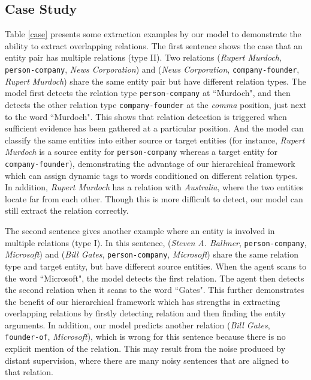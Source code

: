 \documentclass[letterpaper]{article}
\theoremstyle{definition}
\begin{document}
\subsection{Case Study}


Table \ref{case} presents some extraction examples by our model to demonstrate the ability to extract overlapping relations. The first sentence shows the case that an entity pair has multiple relations (type II). Two relations (\textit{Rupert Murdoch}, \texttt{person-company}, \textit{News Corporation}) and (\textit{News Corporation}, \texttt{company-founder}, \textit{Rupert Murdoch}) share the same entity pair but have different relation types. The model first detects the relation type \texttt{person-company} at ``Murdoch", and then detects the other relation type \texttt{company-founder} at the \textit{comma} position, just next to the word ``Murdoch". This shows that relation detection is triggered when sufficient evidence has been gathered at a particular position.
And the model can classify the same entities into either source or target entities (for instance, \textit{Rupert Murdoch} is a source entity for \texttt{person-company} whereas a target entity for \texttt{company-founder}), demonstrating the advantage of our hierarchical framework which can assign dynamic tags to words conditioned on different relation types.
In addition, \textit{Rupert Murdoch} has a relation with \textit{Australia}, where the two entities locate far from each other. Though this is more difficult to detect, our model can still extract the relation correctly.

The second sentence gives another example where an entity is involved in multiple relations (type I). In this sentence, (\textit{Steven A. Ballmer}, \texttt{person-company}, \textit{Microsoft}) and (\textit{Bill Gates}, \texttt{person-company}, \textit{Microsoft}) share the same relation type and target entity, but have different source entities. When the agent scans to the word ``Microsoft", the model detects the first relation. The agent then detects the second relation when it scans to the word ``Gates". This further demonstrates the benefit of our hierarchical framework which has strengths in extracting overlapping relations by firstly detecting relation and then finding the entity arguments.
In addition, our model predicts another relation (\textit{Bill Gates}, \texttt{founder-of}, \textit{Microsoft}), which is wrong for this sentence because there is no explicit mention of the relation. This may result from the noise produced by distant supervision, where there are many noisy sentences that are aligned to that relation.
\end{document}
